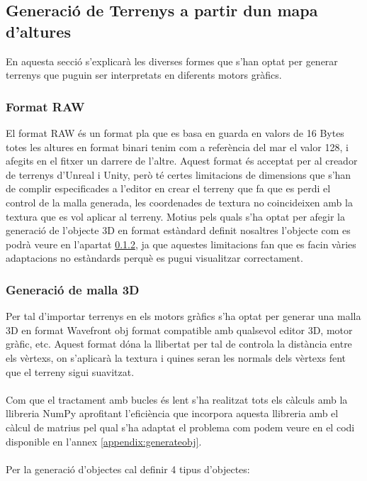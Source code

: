 \documentclass[10pt,a4paper,twocolumn,twoside]{article}
\begin{document}
\subsection{Generació de Terrenys a partir dun mapa d'altures}
En aquesta secció s'explicarà les diverses formes que s'han optat per generar terrenys que puguin ser interpretats en diferents motors gràfics.

\subsubsection{Format RAW}
El format RAW és un format pla que es basa en guarda en valors de 16 Bytes totes les altures en format binari tenim com a referència del mar el valor 128, i afegits en el fitxer un darrere de l'altre. Aquest format és acceptat per al creador de terrenys d'Unreal i Unity, però té certes limitacions de dimensions que s'han de complir especificades a l'editor en crear el terreny que fa que es perdi el control de la malla generada, les coordenades de textura no coincideixen amb la textura que es vol aplicar al terreny. Motius pels quals s'ha optat per afegir la generació de l'objecte 3D en format estàndard definit nosaltres l'objecte com es podrà veure en l'apartat \ref{mesh3d}, ja que aquestes limitacions fan que es facin vàries adaptacions no estàndards perquè es pugui visualitzar correctament.

\subsubsection{Generació de malla 3D}
\label{mesh3d}
Per tal d'importar terrenys en els motors gràfics s'ha optat per generar una malla 3D en format Wavefront obj\cite{wavefrontobj} format compatible amb qualsevol editor 3D, motor gràfic, etc. Aquest format dóna la llibertat per tal de controla la distància entre els vèrtexs, on s'aplicarà la textura i quines seran les normals dels vèrtexs fent que el terreny sigui suavitzat.
\\
\\
Com que el tractament amb bucles és lent s'ha realitzat tots els càlculs amb la llibreria NumPy aprofitant l'eficiència que incorpora aquesta llibreria amb el càlcul de matrius pel qual s'ha adaptat el problema com podem veure en el codi disponible en l'annex \ref{appendix:generateobj}.
\\
\\
Per la generació d'objectes cal definir 4 tipus d'objectes:
\end{document}
